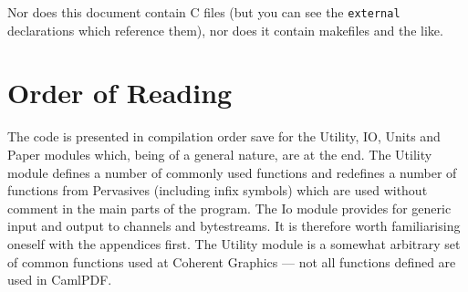 \documentclass[a4paper,10pt]{memoir}
\begin{document}
Nor does this document contain C files (but you can see the \texttt{external}
declarations which reference them), nor does it contain makefiles and the like.

\section{Order of Reading}

The code is presented in compilation order save for the Utility, IO, Units and
Paper modules which, being of a general nature, are at the end. The
\textsf{Utility} module defines a number of commonly used functions and
redefines a number of functions from \textsf{Pervasives} (including infix
symbols) which are used without comment in the main parts of the program. The
\textsf{Io} module provides for generic input and output to channels and
bytestreams. It is therefore worth familiarising oneself with the appendices
first. The \textsf{Utility} module is a somewhat arbitrary set of common
functions used at Coherent Graphics --- not all functions defined are used in
CamlPDF.

\mainmatter
\end{document}
